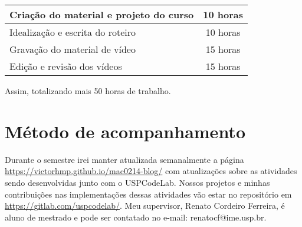\documentclass[10pt,twoside,a4paper]{article}
\begin{document}
\begin{itemize}
        \begin{center}
            \begin{tabular}{ |l|c| } 
                \hline
                     Criação do material e projeto do curso & 10 horas \\
                     \hline
                     Idealização e escrita do roteiro & 10 horas \\
                     \hline
                     Gravação do material de vídeo & 15 horas \\
                     \hline
                     Edição e revisão dos vídeos & 15 horas \\
                \hline
            \end{tabular}
        \end{center}

        Assim, totalizando mais 50 horas de trabalho.
  \end{itemize}

\section{Método de acompanhamento}

    Durante o semestre irei manter atualizada semanalmente a página \url{https://victorhmp.github.io/mac0214-blog/} com atualizações sobre as atividades sendo desenvolvidas junto com o USPCodeLab. Nossos projetos e minhas contribuições nas implementações dessas atividades vão estar no repositório em \url{https://gitlab.com/uspcodelab/}.
    Meu supervisor, Renato Cordeiro Ferreira, é aluno de mestrado e pode ser contatado no e-mail: renatocf@ime.usp.br.
\end{document}
